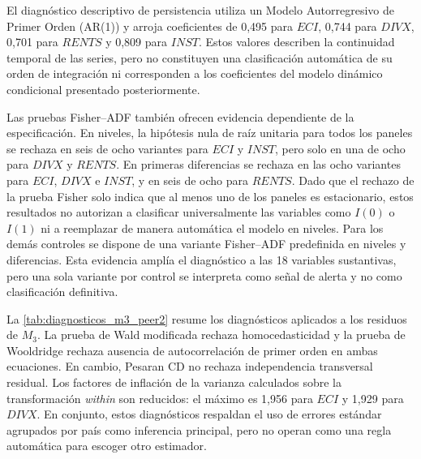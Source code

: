 \documentclass[../../TFM.tex]{subfiles}
\begin{document}
El diagnóstico descriptivo de persistencia utiliza un Modelo Autorregresivo
de Primer Orden (AR(1)) y arroja coeficientes de 0,495
para $ECI$, 0,744 para $DIVX$, 0,701 para $RENTS$ y 0,809 para $INST$. Estos
valores describen la continuidad temporal de las series, pero no constituyen
una clasificación automática de su orden de integración ni corresponden a los
coeficientes del modelo dinámico condicional presentado posteriormente.

Las pruebas Fisher--ADF también ofrecen evidencia dependiente de la
especificación. En niveles, la hipótesis nula de raíz unitaria para todos los
paneles se rechaza en seis de ocho variantes para $ECI$ y $INST$, pero solo en
una de ocho para $DIVX$ y $RENTS$. En primeras diferencias se rechaza en las
ocho variantes para $ECI$, $DIVX$ e $INST$, y en seis de ocho para $RENTS$.
Dado que el rechazo de la prueba Fisher
solo indica que al menos uno de los paneles es estacionario, estos resultados
no autorizan a clasificar universalmente las variables como $I(0)$ o $I(1)$ ni
a reemplazar de manera automática el modelo en niveles.
Para los demás controles se dispone de una variante Fisher--ADF predefinida en
niveles y diferencias. Esta evidencia amplía el diagnóstico a las 18 variables
sustantivas, pero una sola variante por control se interpreta como señal de
alerta y no como clasificación definitiva.

La \autoref{tab:diagnosticos_m3_peer2} resume los diagnósticos aplicados a los
residuos de $M_3$. La prueba de Wald modificada rechaza homocedasticidad y la
prueba de Wooldridge rechaza ausencia de autocorrelación de primer orden en
ambas ecuaciones. En cambio, Pesaran CD no rechaza independencia transversal
residual. Los factores de inflación de la varianza calculados sobre la
transformación \textit{within} son reducidos: el máximo es 1,956 para $ECI$ y
1,929 para $DIVX$. En conjunto, estos diagnósticos respaldan el uso de errores
estándar agrupados por país como inferencia principal, pero no operan como una
regla automática para escoger otro estimador.
\end{document}
